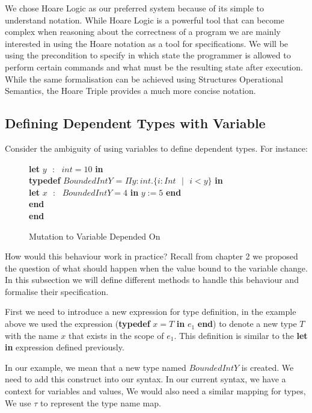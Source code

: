\documentclass[a4paper,12pt]{report}
\newenvironment{tabs}[1]
 {\flushleft\TabPositions{#1}}
 {\endflushleft}
\begin{document}
\par
We chose Hoare Logic as our preferred system because of its simple to understand 
notation. While Hoare Logic is a powerful tool that can become complex when 
reasoning about the correctness of a program we are mainly interested in using 
the Hoare notation as a tool for specifications. We will be using the 
precondition to specify in which state the programmer is allowed to perform 
certain commands and what must be the resulting state after execution. While the 
same formalisation can be achieved using Structures Operational Semantics, the 
Hoare Triple provides a much more concise notation. 


\subsection{Defining Dependent Types with Variable}
Consider the ambiguity of using variables to define dependent types. For 
instance: 

\begin{figure} [H]
  \begin{tabs}{1cm,2cm}
    \textbf{let }$y\text{ }:\text{ } int = 10$ \textbf{ in } \\
    \tab\textbf{typedef }$BoundedIntY$ = $\Pi y : int. \{i : Int\text{ }|\text{ }i < y\}$ \textbf{ in } \\ 
    \tab\tab\textbf{let }$x\text{ }:\text{ }BoundedIntY = 4$ \textbf{ in }$y := 5$\textbf { end} \\
    \tab\textbf {end} \\
    \textbf{end}
  \end{tabs}  
  \caption{Mutation to Variable Depended On}
\end{figure}

\par
How would this behaviour work in practice? Recall from chapter 2 we proposed the 
question of what should happen when the value bound to the variable change. In 
this subsection we will define different methods to handle this behaviour and 
formalise their specification.

\par
First we need to introduce a new expression for type definition, in the example 
above we used the expression (\textbf{typedef} $x = T$ \textbf{ in }$e_1$ \textbf {end}) 
to denote a new type $T$ with the name $x$ that exists in the scope of $e_1$. 
This definition is similar to the \textbf{let in} expression defined previously. 

In our example, we mean 
that a new type named $BoundedIntY$ is created. We need to add this construct 
into our syntax. In our current syntax, we have a context for variables and 
values, We would also need a similar mapping for types, We use $\tau$ to 
represent the type name map. 
\end{document}
